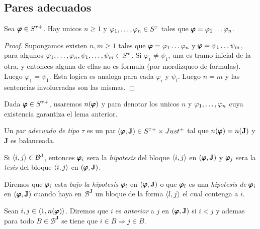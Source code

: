 \subsection{Pares adecuados}
\begin{lemma}
  Sea $\pvarphi\in S^{\tau+}$. Hay unicos $n\geq1$ y $\succession{\varphi}{1}{n}\in S^\tau$ tales que $\pvarphi=\succession[]{\varphi}{1}{n}$.
\end{lemma}
\begin{proof}
  Supongamos existen $n,m\geq1$ tales que $\pvarphi=\succession[]{\varphi}{1}{n}$ y $\pvarphi=\succession[]{\psi}{1}{m}$,
  para algunos $\succession{\varphi}{1}{n}, \succession{\psi}{1}{m} \in S^\tau$. Si $\varphi_1 \neq \psi_1$,
  una es tramo inicial de la otra, y entonces alguna de ellas no es formula (por mordizqueo de formulas). Luego $\varphi_1 = \psi_1$. Esta logica es analoga para 
  cada $\varphi_i$ y $\psi_i$. Luego $n=m$ y las sentencias involucradas son las mismas. 
\end{proof}

\begin{definition}
  Dada $\pvarphi\in S^{\tau+}$, usaremos $n(\pvarphi)$ y  para denotar los unicos 
  $n $ y $\succession{\varphi}{1}{n}$ cuya existencia garantiza el lema anterior.
\end{definition}

\begin{definition}
  Un \emph{par adecuado de tipo $\tau$} es un par $\padec\in S^{\tau+}\times Just^+$ tal que $n(\pvarphi)=n(\mathbf{J})$ y $\mathbf{J}$ es balanceada.

  Si $\bloq{i}{j} \in \mathcal{B}^\mathbf{J}$, entonces $\pvarphi_i$ sera la \emph{hipotesis} del bloque $\bloq{i}{j}$ en $\padec$ y 
  $\pvarphi_j$ sera la \emph{tesis} del bloque $\bloq{i}{j}$ en $\padec$.

  Diremos que $\pvarphi_i$ esta \emph{bajo la hipotesis} $\pvarphi_l$ en $\padec$ o que $\pvarphi_l$ es una 
  \emph{hipotesis de } $\pvarphi_i$ en $\padec$ cuando haya en $\mathcal{B}^\mathbf{J}$ un bloque de la forma $\bloq{l}{j}$ el cual 
  contenga a $i$.
  
  Sean $i,j\in\bloq{1}{n(\pvarphi)}$. Diremos que $i$ es \emph{anterior} a $j$ en $\padec$ si $i < j$ y ademas para todo $B \in \mathcal{B}^\mathbf{J}$ se tiene 
  que $i\in B \Rightarrow j\in B$.
\end{definition}

